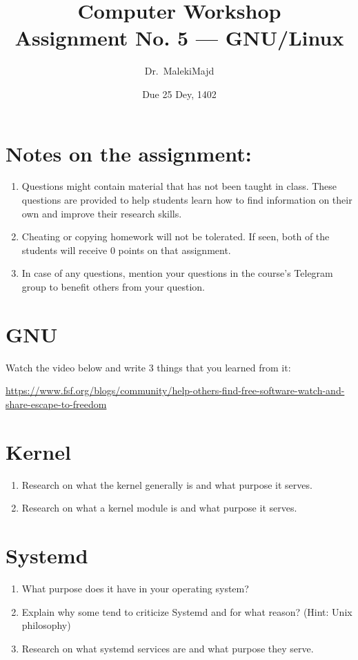 \documentclass[titlepage]{article}
\title{Computer Workshop\\Assignment No. 5 --- GNU/Linux}
\author{Dr.\ MalekiMajd}
\date{Due 25 Dey, 1402}
\begin{document}
\maketitle

\section*{Notes on the assignment:}
\begin{enumerate}
        \item Questions might contain material that has not been taught in class.
        These questions are provided to help students learn how to find
        information on their own and improve their research skills.
    \item Cheating or copying homework will not be tolerated. If seen, both of
        the students will receive 0 points on that assignment.
    \item In case of any questions, mention your questions in the course's Telegram
        group to benefit others from your question.
\end{enumerate}

\pagebreak

\section{GNU}
Watch the video below and write 3 things that you learned from it:


\url{https://www.fsf.org/blogs/community/help-others-find-free-software-watch-and-share-escape-to-freedom}

\section{Kernel}
\begin{enumerate}
    \item Research on what the kernel generally is and what purpose it serves.
    \item Research on what a kernel module is and what purpose it serves.
\end{enumerate}

\section{Systemd}
\begin{enumerate}
    \item What purpose does it have in your operating system?
    \item Explain why some tend to criticize Systemd and for what reason? (Hint: Unix philosophy)
    \item Research on what systemd services are and what purpose they serve.
\end{enumerate}
\end{document}
